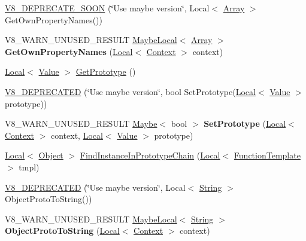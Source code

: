 \begin{DoxyCompactItemize}
\item 
\hyperlink{classv8_1_1Object_aa72e9d0d22d1d4a4c4b63827a5469d40}{V8\+\_\+\+D\+E\+P\+R\+E\+C\+A\+T\+E\+\_\+\+S\+O\+ON} (\char`\"{}Use maybe version\char`\"{}, Local$<$ \hyperlink{classv8_1_1Array}{Array} $>$ Get\+Own\+Property\+Names())
\item 
V8\+\_\+\+W\+A\+R\+N\+\_\+\+U\+N\+U\+S\+E\+D\+\_\+\+R\+E\+S\+U\+LT \hyperlink{classv8_1_1MaybeLocal}{Maybe\+Local}$<$ \hyperlink{classv8_1_1Array}{Array} $>$ {\bfseries Get\+Own\+Property\+Names} (\hyperlink{classv8_1_1Local}{Local}$<$ \hyperlink{classv8_1_1Context}{Context} $>$ context)\hypertarget{classv8_1_1Object_ab4f1fc692a02c11d749a7d5120e67026}{}\label{classv8_1_1Object_ab4f1fc692a02c11d749a7d5120e67026}

\item 
\hyperlink{classv8_1_1Local}{Local}$<$ \hyperlink{classv8_1_1Value}{Value} $>$ \hyperlink{classv8_1_1Object_ae8d3fed7d6dbd667c29cabb3039fe7af}{Get\+Prototype} ()
\item 
\hyperlink{classv8_1_1Object_a4ce54e137e22eddbe2857a15a20219b2}{V8\+\_\+\+D\+E\+P\+R\+E\+C\+A\+T\+ED} (\char`\"{}Use maybe version\char`\"{}, bool Set\+Prototype(\hyperlink{classv8_1_1Local}{Local}$<$ \hyperlink{classv8_1_1Value}{Value} $>$ prototype))
\item 
V8\+\_\+\+W\+A\+R\+N\+\_\+\+U\+N\+U\+S\+E\+D\+\_\+\+R\+E\+S\+U\+LT \hyperlink{classv8_1_1Maybe}{Maybe}$<$ bool $>$ {\bfseries Set\+Prototype} (\hyperlink{classv8_1_1Local}{Local}$<$ \hyperlink{classv8_1_1Context}{Context} $>$ context, \hyperlink{classv8_1_1Local}{Local}$<$ \hyperlink{classv8_1_1Value}{Value} $>$ prototype)\hypertarget{classv8_1_1Object_a1f1fc25d2a440ad2a8b7d94db04f88fb}{}\label{classv8_1_1Object_a1f1fc25d2a440ad2a8b7d94db04f88fb}

\item 
\hyperlink{classv8_1_1Local}{Local}$<$ \hyperlink{classv8_1_1Object}{Object} $>$ \hyperlink{classv8_1_1Object_ae2ad9fee9db6e0e5da56973ebb8ea2bc}{Find\+Instance\+In\+Prototype\+Chain} (\hyperlink{classv8_1_1Local}{Local}$<$ \hyperlink{classv8_1_1FunctionTemplate}{Function\+Template} $>$ tmpl)
\item 
\hyperlink{classv8_1_1Object_a06bb9aab716e466b8fa0e0c3fbb8f5d7}{V8\+\_\+\+D\+E\+P\+R\+E\+C\+A\+T\+ED} (\char`\"{}Use maybe version\char`\"{}, Local$<$ \hyperlink{classv8_1_1String}{String} $>$ Object\+Proto\+To\+String())
\item 
V8\+\_\+\+W\+A\+R\+N\+\_\+\+U\+N\+U\+S\+E\+D\+\_\+\+R\+E\+S\+U\+LT \hyperlink{classv8_1_1MaybeLocal}{Maybe\+Local}$<$ \hyperlink{classv8_1_1String}{String} $>$ {\bfseries Object\+Proto\+To\+String} (\hyperlink{classv8_1_1Local}{Local}$<$ \hyperlink{classv8_1_1Context}{Context} $>$ context)\hypertarget{classv8_1_1Object_a7a65552d78eff4a1b9755f99167f4255}{}\label{classv8_1_1Object_a7a65552d78eff4a1b9755f99167f4255}


\end{DoxyCompactItemize}
